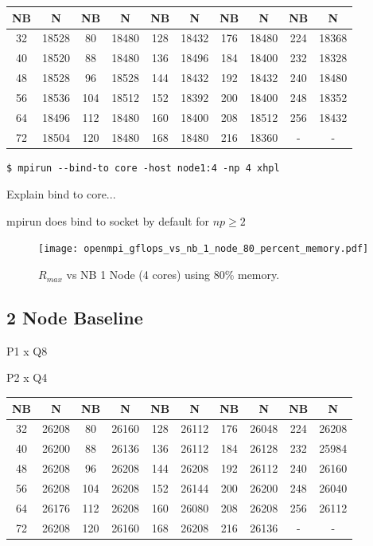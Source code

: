 \documentclass{report}
\begin{document}
\begin{center}
	\begin{tabular}{ |c|c|c|c|c|c|c|c|c|c| } 
		\hline
		NB & N & NB & N & NB & N & NB & N & NB & N \\ 
		\hline
		32 & 18528 &  80 & 18480 & 128 & 18432 & 176 & 18480 & 224 & 18368 \\ 
		40 & 18520 &  88 & 18480 & 136 & 18496 & 184 & 18400 & 232 & 18328 \\ 
 		48 & 18528 &  96 & 18528 & 144 & 18432 & 192 & 18432 & 240 & 18480 \\
		56 & 18536 & 104 & 18512 & 152 & 18392 & 200 & 18400 & 248 & 18352 \\ 
 		64 & 18496 & 112 & 18480 & 160 & 18400 & 208 & 18512 & 256 & 18432 \\
		72 & 18504 & 120 & 18480 & 168 & 18480 & 216 & 18360 &   - &     - \\ 
 		\hline
	\end{tabular}
\end{center}

\lstset{style=termstyle}
\begin{lstlisting}[]
$ mpirun --bind-to core -host node1:4 -np 4 xhpl
\end{lstlisting}

Explain bind to core...

mpirun does bind to socket by default for $np \geq 2$

\begin{figure}
	\centering	
	\texttt{[image: openmpi\_gflops\_vs\_nb\_1\_node\_80\_percent\_memory.pdf]}
	\caption{$R_{max}$ vs NB 1 Node (4 cores) using 80\% memory.}
\end{figure}



\subsection{2 Node Baseline}

P1 x Q8

P2 x Q4

\begin{center}
	\begin{tabular}{ |c|c|c|c|c|c|c|c|c|c| } 
		\hline
		NB & N & NB & N & NB & N & NB & N & NB & N \\ 
		\hline
		32 & 26208 &   80 & 26160 & 128 & 26112 & 176 & 26048 & 224 & 26208 \\ 
		40 & 26200 &   88 & 26136 & 136 & 26112 & 184 & 26128 & 232 & 25984 \\ 
 		48 & 26208 &   96 & 26208 & 144 & 26208 & 192 & 26112 & 240 & 26160 \\
		56 & 26208 & 104 & 26208 & 152 & 26144 & 200 & 26200 & 248 & 26040 \\ 
 		64 & 26176 & 112 & 26208 & 160 & 26080 & 208 & 26208 & 256 & 26112 \\
		72 & 26208 & 120 & 26160 & 168 & 26208 & 216 & 26136 &     - &         - \\ 
 		\hline
	\end{tabular}
\end{center}
\end{document}
